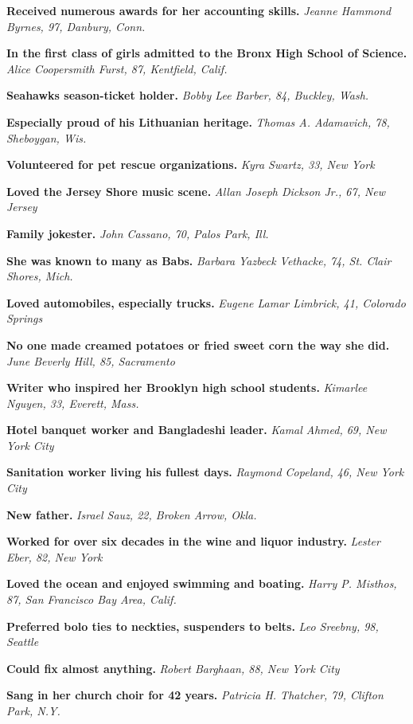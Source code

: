 \textbf{Received numerous awards for her accounting skills.}
\emph{Jeanne Hammond Byrnes, 97, Danbury, Conn.}

\textbf{In the first class of girls admitted to the Bronx High School of
Science.} \emph{Alice Coopersmith Furst, 87, Kentfield, Calif.}

\textbf{Seahawks season-ticket holder.} \emph{Bobby Lee Barber, 84,
Buckley, Wash.}

\textbf{Especially proud of his Lithuanian heritage.} \emph{Thomas A.
Adamavich, 78, Sheboygan, Wis.}

\textbf{Volunteered for pet rescue organizations.} \emph{Kyra Swartz,
33, New York}

\textbf{Loved the Jersey Shore music scene.} \emph{Allan Joseph Dickson
Jr., 67, New Jersey}

\textbf{Family jokester.} \emph{John Cassano, 70, Palos Park, Ill.}

\textbf{She was known to many as Babs.} \emph{Barbara Yazbeck Vethacke,
74, St. Clair Shores, Mich.}

\textbf{Loved automobiles, especially trucks.} \emph{Eugene Lamar
Limbrick, 41, Colorado Springs}

\textbf{No one made creamed potatoes or fried sweet corn the way she
did.} \emph{June Beverly Hill, 85, Sacramento}

\textbf{Writer who inspired her Brooklyn high school students.}
\emph{Kimarlee Nguyen, 33, Everett, Mass.}

\textbf{Hotel banquet worker and Bangladeshi leader.} \emph{Kamal Ahmed,
69, New York City}

\textbf{Sanitation worker living his fullest days.} \emph{Raymond
Copeland, 46, New York City}

\textbf{New father.} \emph{Israel Sauz, 22, Broken Arrow, Okla.}

\textbf{Worked for over six decades in the wine and liquor industry.}
\emph{Lester Eber, 82, New York}

\textbf{Loved the ocean and enjoyed swimming and boating.} \emph{Harry
P. Misthos, 87, San Francisco Bay Area, Calif.}

\textbf{Preferred bolo ties to neckties, suspenders to belts.} \emph{Leo
Sreebny, 98, Seattle}

\textbf{Could fix almost anything.} \emph{Robert Barghaan, 88, New York
City}

\textbf{Sang in her church choir for 42 years.} \emph{Patricia H.
Thatcher, 79, Clifton Park, N.Y.}

